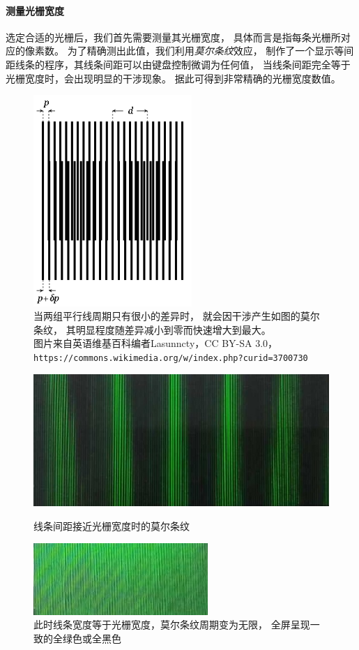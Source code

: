 \documentclass[12pt,a4paper]{article}
\begin{document}
\paragraph{测量光栅宽度}
选定合适的光栅后，我们首先需要测量其光栅宽度，
具体而言是指每条光栅所对应的像素数。
为了精确测出此值，我们利用\emph{莫尔条纹}效应，
制作了一个显示等间距线条的程序，其线条间距可以由键盘控制微调为任何值，
当线条间距完全等于光栅宽度时，会出现明显的干涉现象。
据此可得到非常精确的光栅宽度数值。
\begin{figure}[h!]
    \centering\includegraphics[width=6cm]{300px-Moire_parallel.svg.png}
    \caption{当两组平行线周期只有很小的差异时，
        就会因干涉产生如图的莫尔条纹，
        其明显程度随差异减小到零而快速增大到最大。\\
        {\scriptsize 图片来自英语维基百科编者Lasunncty，CC BY-SA 3.0，
        \texttt{https://commons.wikimedia.org/w/index.php?curid=3700730}}}
\end{figure}
\begin{figure}
    \begin{minipage}[t]{0.5\linewidth}
    \centering\includegraphics[width=0.8\linewidth]{near}
    \caption{线条间距接近光栅宽度时的莫尔条纹}
    \end{minipage}\begin{minipage}[t]{0.5\linewidth}
    \centering\includegraphics[width=0.8\linewidth]{exact}
    \caption{此时线条宽度等于光栅宽度，莫尔条纹周期变为无限，
        全屏呈现一致的全绿色或全黑色}
    \end{minipage}
\end{figure}
\FloatBarrier
\end{document}
